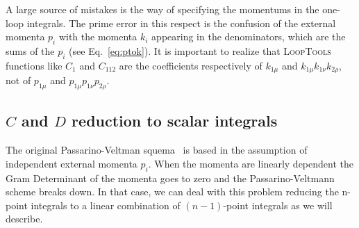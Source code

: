 A large source of mistakes is the way of specifying the momentums in the
one-loop integrals.  The prime error in this respect is the confusion of
the external momenta $p_i$ with the momenta $k_i$ appearing in the
denominators, which are the sums of the $p_i$ (see Eq.~\eqref{eq:ptok}).
%
It is important to realize that \textsc{LoopTools} functions like $C_1$ and
$C_{112}$ are the coefficients respectively of $k_{1\mu}$ and $k_{1\mu}
k_{1\nu} k_{2\rho}$, not of $p_{1\mu}$ and $p_{1\mu} p_{1\nu} p_{2\rho}$.









\subsection{$C$ and $D$ reduction to scalar integrals}
\label{sec:CD-reduction}

The original Passarino-Veltman squema~\cite{Passarino:1978jh} is based in the assumption of independent external momenta $p_i$. When the momenta are linearly dependent the Gram Determinant of the momenta goes to zero and the Passarino-Veltmann scheme breaks down. In that case, we can deal with this problem reducing the n-point integrals to a linear combination of $(n-1)$-point integrals as we will describe.
  
